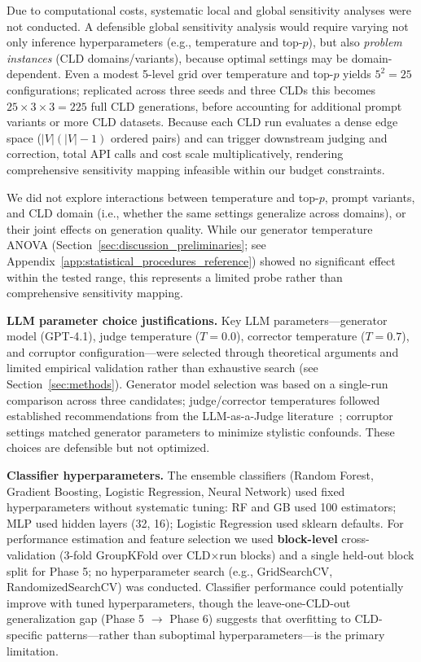 Due to computational costs, systematic local and global sensitivity analyses were not conducted. A defensible global sensitivity analysis would require varying not only inference hyperparameters (e.g., temperature and top-$p$), but also \textit{problem instances} (CLD domains/variants), because optimal settings may be domain-dependent. Even a modest 5-level grid over temperature and top-$p$ yields $5^2 = 25$ configurations; replicated across three seeds and three CLDs this becomes $25 \times 3 \times 3 = 225$ full CLD generations, before accounting for additional prompt variants or more CLD datasets. Because each CLD run evaluates a dense edge space ($|V|(|V|-1)$ ordered pairs) and can trigger downstream judging and correction, total API calls and cost scale multiplicatively, rendering comprehensive sensitivity mapping infeasible within our budget constraints.

We did not explore interactions between temperature and top-$p$, prompt variants, and CLD domain (i.e., whether the same settings generalize across domains), or their joint effects on generation quality. While our generator temperature ANOVA (Section~\ref{sec:discussion_preliminaries}; see Appendix~\ref{app:statistical_procedures_reference}) showed no significant effect within the tested range, this represents a limited probe rather than comprehensive sensitivity mapping.

\textbf{LLM parameter choice justifications.} Key LLM parameters---generator model (GPT-4.1), judge temperature ($T=0.0$), corrector temperature ($T=0.7$), and corruptor configuration---were selected through theoretical arguments and limited empirical validation rather than exhaustive search (see Section~\ref{sec:methods}). Generator model selection was based on a single-run comparison across three candidates; judge/corrector temperatures followed established recommendations from the LLM-as-a-Judge literature~\citep{liu2023gevalnlgevaluationusing, zheng2024judging, madaan2023selfrefineiterativerefinementselffeedback}; corruptor settings matched generator parameters to minimize stylistic confounds. These choices are defensible but not optimized.

\textbf{Classifier hyperparameters.} The ensemble classifiers (Random Forest, Gradient Boosting, Logistic Regression, Neural Network) used fixed hyperparameters without systematic tuning: RF and GB used 100 estimators; MLP used hidden layers (32, 16); Logistic Regression used sklearn defaults. For performance estimation and feature selection we used \textbf{block-level} cross-validation (3-fold GroupKFold over CLD$\times$run blocks) and a single held-out block split for Phase 5; no hyperparameter search (e.g., GridSearchCV, RandomizedSearchCV) was conducted. Classifier performance could potentially improve with tuned hyperparameters, though the leave-one-CLD-out generalization gap (Phase 5 $\rightarrow$ Phase 6) suggests that overfitting to CLD-specific patterns---rather than suboptimal hyperparameters---is the primary limitation.

